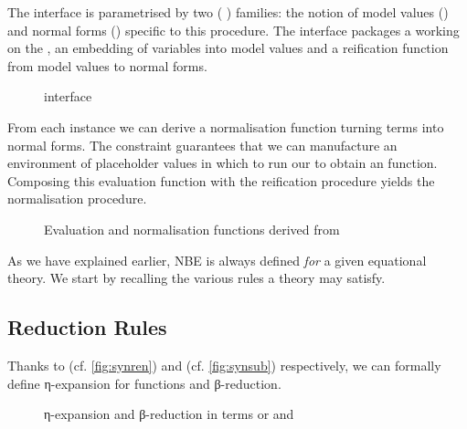 The  interface is parametrised by two ( )
families: the notion of model values () and normal forms
() specific to this procedure. The interface packages a 
working on the , an embedding of variables into model values
and a reification function from model values to normal forms.

\begin{figure}[h]
\caption{ interface}\label{fig:nbeinterface}
\end{figure}

From each  instance we can derive a normalisation function turning
terms into normal forms. The  constraint guarantees that we can
manufacture an environment of placeholder values in which to run our
 to obtain an  function. Composing this evaluation
function with the reification procedure yields the normalisation procedure.

\begin{figure}[h]
\begin{minipage}[t]{0.55\textwidth}
\end{minipage}\begin{minipage}[t]{0.35\textwidth}
\end{minipage}
\caption{Evaluation and normalisation functions derived from }\label{fig:nbeinterface}
\end{figure}



As we have explained earlier, NBE is always defined \emph{for} a given
equational theory. We start by recalling the various rules a theory may
satisfy.

\subsection{Reduction Rules}

Thanks to  (cf. \cref{fig:synren}) and 
(cf. \cref{fig:synsub}) respectively, we can formally define η-expansion
for functions and β-reduction.

\begin{figure}[h]
\caption{η-expansion and β-reduction in terms or  and }
\end{figure}

